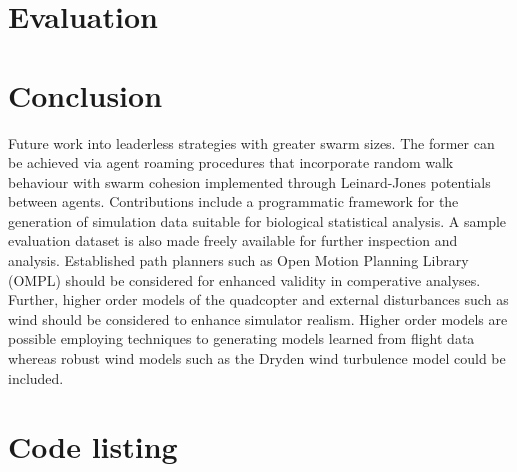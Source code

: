 \documentclass{report}
\begin{document}
\chapter{Evaluation}

\chapter{Conclusion}
Future work into leaderless strategies with greater swarm sizes. The former can be achieved via agent roaming procedures that incorporate random walk behaviour with swarm cohesion implemented through Leinard-Jones potentials between agents.
Contributions include a programmatic framework for the generation of simulation data suitable for biological statistical analysis. A sample evaluation dataset is also made freely available for further inspection and analysis. Established path planners such as Open Motion Planning Library (OMPL) \cite{Sucan2012} should be considered for enhanced validity in comperative analyses. Further, higher order models of the quadcopter and external disturbances such as wind should be considered to enhance simulator realism. Higher order models are possible employing techniques to generating models learned from flight data \cite{Symington2014} whereas robust wind models such as the Dryden wind turbulence model \cite{Dryden} could be included.

\appendix


\chapter{Code listing}
\end{document}
